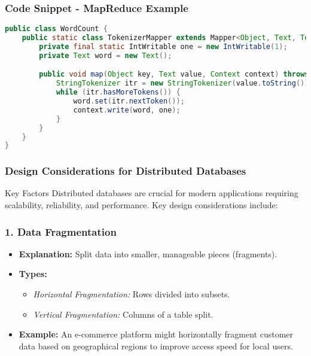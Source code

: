 \documentclass[aspectratio=169]{beamer}
\begin{document}
\begin{frame}[fragile]
    \frametitle{Code Snippet - MapReduce Example}
    \begin{lstlisting}[language=Java]
public class WordCount {
    public static class TokenizerMapper extends Mapper<Object, Text, Text, IntWritable> {
        private final static IntWritable one = new IntWritable(1);
        private Text word = new Text();

        public void map(Object key, Text value, Context context) throws IOException, InterruptedException {
            StringTokenizer itr = new StringTokenizer(value.toString());
            while (itr.hasMoreTokens()) {
                word.set(itr.nextToken());
                context.write(word, one);
            }
        }
    }
}
    \end{lstlisting}
\end{frame}

\begin{frame}
    \frametitle{Design Considerations for Distributed Databases}
    \begin{block}{Key Factors}
        Distributed databases are crucial for modern applications requiring scalability, reliability, and performance. Key design considerations include:
    \end{block}
\end{frame}

\begin{frame}[fragile]
    \frametitle{1. Data Fragmentation}
    \begin{itemize}
        \item \textbf{Explanation:} Split data into smaller, manageable pieces (fragments).
        \item \textbf{Types:}
            \begin{itemize}
                \item \textit{Horizontal Fragmentation:} Rows divided into subsets.
                \item \textit{Vertical Fragmentation:} Columns of a table split.
            \end{itemize}
        \item \textbf{Example:} An e-commerce platform might horizontally fragment customer data based on geographical regions to improve access speed for local users.
    \end{itemize}
\end{frame}
\end{document}
